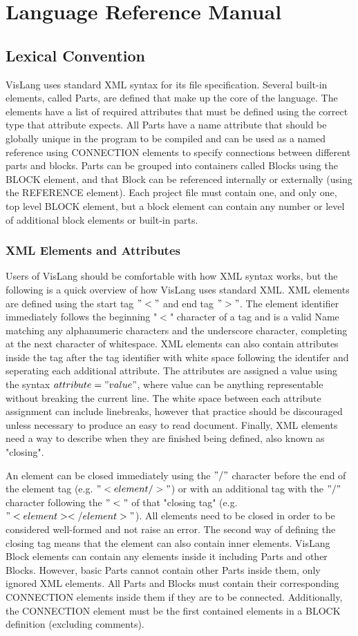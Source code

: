\section{Language Reference Manual}
\subsection{Lexical Convention}
VisLang uses standard XML syntax for its file specification.
Several built-in elements, called Parts, are defined that make up the core of the language.
The elements have a list of required attributes that must be defined using the correct type that attribute expects.
 All Parts have a name attribute that should be globally unique in the program to be compiled and can be used as a named reference using CONNECTION elements to specify connections between different parts and blocks.
Parts can be grouped into containers called Blocks using the BLOCK element, and that Block can be referenced internally or externally (using the REFERENCE element).
Each project file must contain one, and only one, top level BLOCK element, but a block element can contain any number or level of additional block elements or built-in parts.
\subsubsection{XML Elements and Attributes}
Users of VisLang should be comfortable with how XML syntax works, but the following is a quick overview of how VisLang uses standard XML.
XML elements are defined using the start tag $"<"$ and end tag $">"$.
The element identifier immediately follows the beginning "$<$" character of a tag and is a valid Name matching any alphanumeric characters and the underscore character, completing at the next character of whitespace.
XML elements can also contain attributes inside the tag after the tag identifier with white space following the identifer and seperating each additional attribute.
The attributes are assigned a value using the syntax $attribute="value"$, where value can be anything representable without breaking the current line.
The white space between each attribute assignment can include linebreaks, however that practice should be discouraged unless necessary to produce an easy to read document.
Finally, XML elements need a way to describe when they are finished being defined, also known as "closing".
\par
An element can be closed immediately using the $"/"$ character before the end of the element tag (e.g. $"<element/>"$) or with an additional tag with the $"/"$ character following the $"<"$ of that "closing tag" (e.g. $"<element></element>"$).
All elements need to be closed in order to be considered well-formed and not raise an error.
The second way of defining the closing tag means that the element can also contain inner elements.
VisLang Block elements can contain any elements inside it including Parts and other Blocks.
However, basic Parts cannot contain other Parts inside them, only ignored XML elements.
All Parts and Blocks must contain their corresponding CONNECTION elements inside them if they are to be connected.
Additionally, the CONNECTION element must be the first contained elements in a BLOCK definition (excluding comments).

